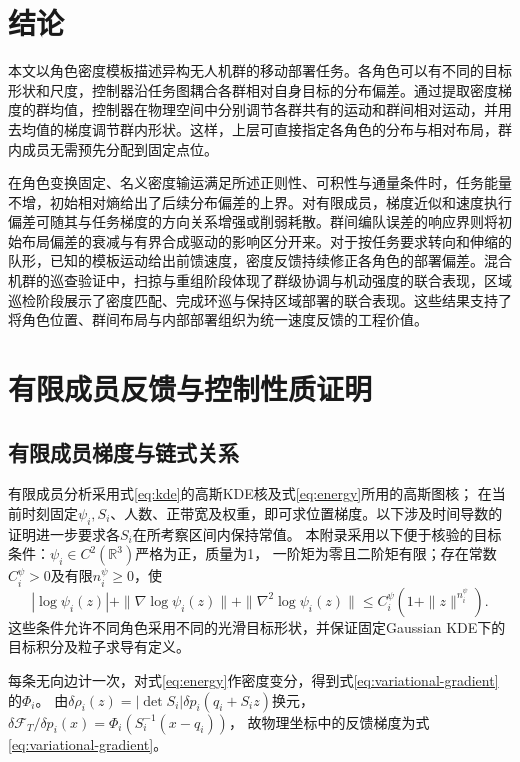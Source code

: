 \documentclass[UTF8,a4paper,11pt,fontset=none]{ctexart}
\newcommand{\R}{\mathbb R}\newcommand{\KL}{\operatorname{KL}}
\begin{document}
\section{结论}
本文以角色密度模板描述异构无人机群的移动部署任务。各角色可以有不同的目标形状和尺度，控制器沿任务图耦合各群相对自身目标的分布偏差。通过提取密度梯度的群均值，控制器在物理空间中分别调节各群共有的运动和群间相对运动，并用去均值的梯度调节群内形状。这样，上层可直接指定各角色的分布与相对布局，群内成员无需预先分配到固定点位。

在角色变换固定、名义密度输运满足所述正则性、可积性与通量条件时，任务能量不增，初始相对熵给出了后续分布偏差的上界。对有限成员，梯度近似和速度执行偏差可随其与任务梯度的方向关系增强或削弱耗散。群间编队误差的响应界则将初始布局偏差的衰减与有界合成驱动的影响区分开来。对于按任务要求转向和伸缩的队形，已知的模板运动给出前馈速度，密度反馈持续修正各角色的部署偏差。混合机群的巡查验证中，扫掠与重组阶段体现了群级协调与机动强度的联合表现，区域巡检阶段展示了密度匹配、完成环巡与保持区域部署的联合表现。这些结果支持了将角色位置、群间布局与内部部署组织为统一速度反馈的工程价值。

\appendix
\section{有限成员反馈与控制性质证明}\label{app:interfaces}

\subsection{有限成员梯度与链式关系}\label{app:graph-query}\label{app:template-conditions}
有限成员分析采用式\eqref{eq:kde}的高斯KDE核及式\eqref{eq:energy}所用的高斯图核；
在当前时刻固定$\psi_i,S_i$、人数、正带宽及权重，即可求位置梯度。以下涉及时间导数的证明进一步要求各$S_i$在所考察区间内保持常值。
本附录采用以下便于核验的目标条件：$\psi_i\in C^2(\R^3)$严格为正，质量为1，
一阶矩为零且二阶矩有限；存在常数$C_i^\psi>0$及有限$n_i^\psi\ge0$，使
\[
|\log\psi_i(z)|+\|\nabla\log\psi_i(z)\|+\|\nabla^2\log\psi_i(z)\|
\le C_i^\psi(1+\|z\|^{n_i^\psi}).
\]
这些条件允许不同角色采用不同的光滑目标形状，并保证固定Gaussian KDE下的目标积分及粒子求导有定义。

每条无向边计一次，对式\eqref{eq:energy}作密度变分，得到式\eqref{eq:variational-gradient}的$\Phi_i$。
由$\delta\rho_i(z)=|\det S_i|\delta p_i(q_i+S_i z)$换元，
$\delta\mathcal F_T/\delta p_i(x)=\Phi_i(S_i^{-1}(x-q_i))$，
故物理坐标中的反馈梯度为式\eqref{eq:variational-gradient}。
\end{document}
